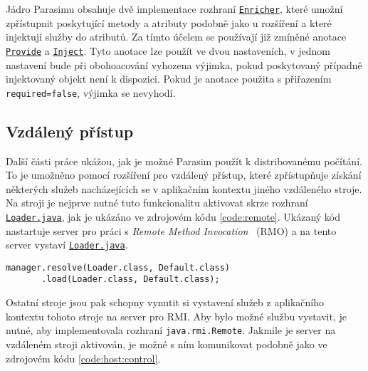 Jádro Parasimu obsahuje dvě implementace rozhraní \href{https://github.com/sybila/parasim/blob/2.0.0.Final/core/src/main/java/org/sybila/parasim/core/spi/enrichment/Enricher.java}{\texttt{Enricher}},
které umožní zpřístupnit poskytující metody a atributy podobně jako u rozšíření 
a které injektují služby do atributů. Za tímto účelem se používají již zmíněné anotace \href{https://github.com/sybila/parasim/blob/2.0.0.Final/core/src/main/java/org/sybila/parasim/core/annotation/Provide.java}{\texttt{Provide}} a \href{https://github.com/sybila/parasim/blob/2.0.0.Final/core/src/main/java/org/sybila/parasim/core/annotation/Inject.java}{\texttt{Inject}}.
Tyto anotace lze použít ve dvou nastaveních, v jednom nastavení bude při obohoacování
vyhozena výjimka, pokud poskytovaný případně injektovaný objekt není k dispozici.
Pokud je anotace použita s přiřazením \texttt{required=false}, výjimka se nevyhodí.

\subsection{Vzdálený přístup}\label{section:remote}

Další části práce ukážou, jak je možné Parasim použít k distribovanému počítání.
To je umožněno pomocí rozšíření pro vzdálený přístup, které zpří\-stup\-ňu\-je získání
některých služeb nacházejících se v aplikačním kontextu jiného vzdá\-le\-né\-ho stroje.
Na stroji je nejprve nutné tuto funkcionalitu aktivovat skrze rozhraní \href{https://github.com/sybila/parasim/blob/2.0.0.Final/core/src/main/java/org/sybila/parasim/core/api/remote/Loader.java}{\texttt{Loader.java}},
jak je ukázáno ve zdrojovém kódu \ref{code:remote}. Ukázaný kód nastartuje server
pro práci s \textit{Remote Method Invocation}~\cite{grosso2001} (RMO) a na tento server vystaví \href{https://github.com/sybila/parasim/blob/2.0.0.Final/core/src/main/java/org/sybila/parasim/core/api/remote/Loader.java}{\texttt{Loader.java}}.

\begin{lstlisting}[label={code:remote}, caption={Spuštění serveru}, style=Java]
manager.resolve(Loader.class, Default.class)
	   .load(Loader.class, Default.class);
\end{lstlisting}
Ostatní stroje jsou pak schopny vynutit si vystavení služeb z aplikač\-ní\-ho kontextu
tohoto stroje na server pro RMI. Aby bylo možné službu vystavit, je nutné, aby implementovala
rozhraní \texttt{java.rmi.Remote}. Jakmile je server na vzdáleném stroji aktivován,
je možné s ním komunikovat podobně jako ve zdrojovém kódu \ref{code:host:control}.

